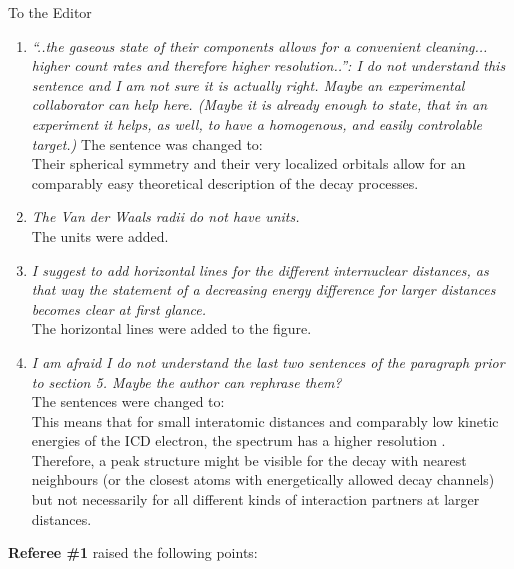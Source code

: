 \documentclass[DIN,pagenumber=false,parskip=half,fromalign=left,fromphone=true,fromemail=true,fromurl=false,fromlogo=false,fromrule=false]{scrlttr2}
\begin{document}
\begin{letter}{To the Editor}
\begin{enumerate}
\item \emph{``..the gaseous state of their components allows for a convenient cleaning... higher count rates and therefore higher resolution..'': I do not understand this sentence and I am not sure it is actually right. Maybe an experimental collaborator can help here. (Maybe it is already enough to state, that in an experiment it helps, as well, to have a homogenous, and easily controlable target.)}
      The sentence was changed to:\\
      Their spherical
symmetry and their very localized orbitals allow for an comparably easy
theoretical description of the decay processes.
{\color{blue}{The experimental techniques to produce rare gas clusters
are well established
via variety of experimental and theoretical studies
[29, 30, 31, 5]. This makes these clusters a convenient target with controlled and predictable cluster conditions available at sufficient target densities for extended time periods as required in the here described experiments.}}

\item \emph{The Van der Waals radii do not have units.}\\
      The units were added.

\item \emph{I suggest to add horizontal lines for the different internuclear distances, as that way the statement of a decreasing energy difference for larger distances becomes clear at first glance.}\\
      The horizontal lines were added to the figure.

\item \emph{I am afraid I do not understand the last two sentences of the paragraph prior to section 5. Maybe the author can rephrase them?}\\
      The sentences were changed to:\\
      This means that for small interatomic distances and
comparably low kinetic energies of the ICD electron, the
{\color{blue}{energy}} spectrum
has a higher resolution {\color{blue}{of the interatomic distances}}.
Therefore, a peak structure might be visible for the decay with nearest
neighbours (or the closest atoms with energetically allowed decay channels)
but not necessarily for all different kinds of interaction partners at larger
distances.
\end{enumerate}

\textbf{Referee \#1} raised the following points:


\end{letter}
\end{document}
